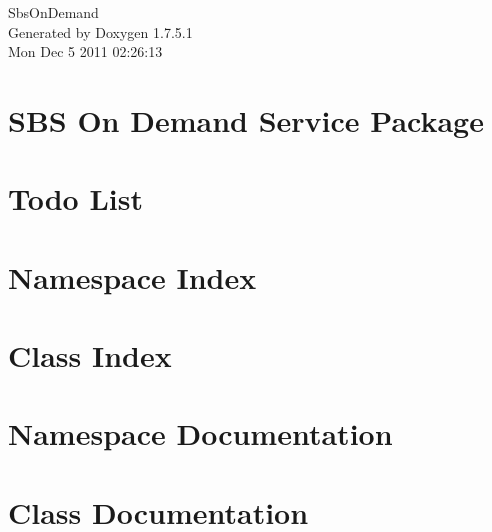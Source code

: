 \documentclass[a4paper]{book}
\begin{document}
\hypersetup{pageanchor=false,citecolor=blue}
\begin{titlepage}
\vspace*{7cm}
\begin{center}
{\Large \-Sbs\-On\-Demand }\\
\vspace*{1cm}
{\large \-Generated by Doxygen 1.7.5.1}\\
\vspace*{0.5cm}
{\small Mon Dec 5 2011 02:26:13}\\
\end{center}
\end{titlepage}
\clearemptydoublepage
{}
\tableofcontents
\clearemptydoublepage
{}
\hypersetup{pageanchor=true,citecolor=blue}
\chapter{\-S\-B\-S \-On \-Demand \-Service \-Package}
\label{index}\hypertarget{index}{}
\chapter{\-Todo \-List}
\label{todo}
\hypertarget{todo}{}

\chapter{\-Namespace \-Index}

\chapter{\-Class \-Index}

\chapter{\-Namespace \-Documentation}







\chapter{\-Class \-Documentation}









\printindex
\end{document}
